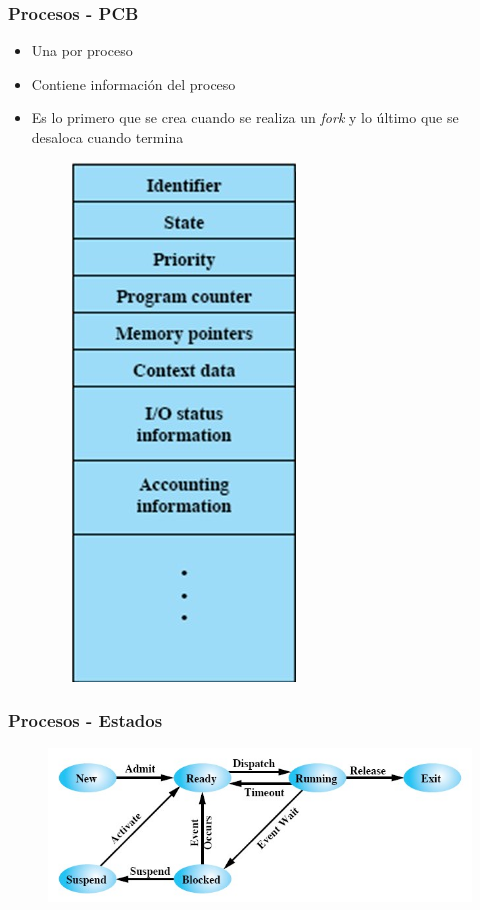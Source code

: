 \begin{frame}
  \frametitle{Procesos - \textbf{PCB}}
  \begin{itemize}
	  \item Una por proceso
	  \item Contiene información del proceso
	  \item Es lo primero que se crea cuando se realiza un \textit{fork} y lo último que se desaloca cuando termina
	  \begin{figure}
			\includegraphics[scale=0.2]{images/pcb.png}
	  \end{figure}	  
  \end{itemize}
\end{frame}

\begin{frame}
  \frametitle{Procesos - \textbf{Estados}}
  \begin{figure}
		\includegraphics[scale=0.5]{images/statesProcess.png}
  \end{figure}
\end{frame}

